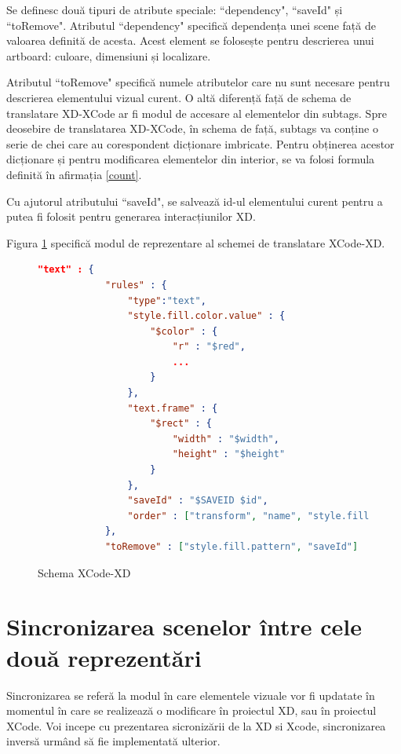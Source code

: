 Se definesc două tipuri de atribute speciale: ``dependency", ``saveId" și ``toRemove". Atributul ``dependency" specifică
dependența unei scene față de valoarea definită de acesta. Acest element se folosește pentru descrierea unui artboard: culoare, dimensiuni și localizare.

Atributul ``toRemove" specifică numele atributelor care nu sunt necesare pentru descrierea elementului vizual curent.
O altă diferență față de schema de translatare XD-XCode ar fi modul de accesare al elementelor din subtags.
Spre deosebire de translatarea XD-XCode, în schema de față, subtags va conține o serie de chei care au corespondent dicționare imbricate. Pentru obținerea acestor dicționare și pentru modificarea elementelor din interior, se va folosi formula definită în afirmația \ref{count}.

Cu ajutorul atributului ``saveId", se salvează id-ul elementului curent pentru a putea fi folosit pentru generarea interacțiunilor XD.

Figura \ref{fig:Schema2} specifică modul de reprezentare al schemei de translatare XCode-XD.

\begin{figure}[!htbp]
\begin{lstlisting}[language=json,firstnumber=1]
 "text" : {
            "rules" : {
                "type":"text",
                "style.fill.color.value" : {
                    "$color" : {
                        "r" : "$red",
                        ...
                    }
                },
                "text.frame" : {
                    "$rect" : {
                        "width" : "$width",
                        "height" : "$height"
                    }
                },
                "saveId" : "$SAVEID $id",
                "order" : ["transform", "name", "style.fill.color.value", "style.font", "text.frame", "text.rawText", "meta.ux.rangedStyles", "text.paragraphs", "saveId"]
            },
            "toRemove" : ["style.fill.pattern", "saveId"] 
\end{lstlisting}
\caption{Schema XCode-XD} \label{fig:Schema2}
\end{figure}

\section{Sincronizarea scenelor între cele două reprezentări}

Sincronizarea se referă la modul în care elementele vizuale vor fi updatate în momentul în care se realizează o modificare în proiectul XD, sau în proiectul XCode.
Voi incepe cu prezentarea sicronizării de la XD si Xcode, sincronizarea inversă urmând să fie implementată ulterior.

